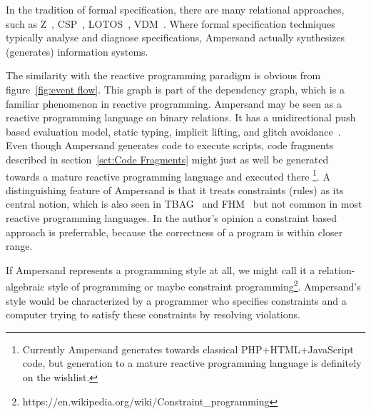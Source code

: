 \documentclass{elsarticle}
\begin{document}
	In the tradition of formal specification, there are many relational approaches, such as Z~\cite{Z}, CSP~\cite{CSP}, LOTOS~\cite{LOTOS}, VDM~\cite{VDM}.
	Where formal specification techniques typically analyse and diagnose specifications,
	Ampersand actually synthesizes (generates) information systems.

	The similarity with the reactive programming paradigm is obvious from figure~\ref{fig:event flow}.
	This graph is part of the dependency graph, which is a familiar phenomenon in reactive programming.
	Ampersand may be seen as a reactive programming language on binary relations.
	It has a unidirectional push based evaluation model, static typing, implicit lifting, and glitch avoidance~\cite{Bainomugisha2013}.
	Even though Ampersand generates code to execute scripts,
	code fragments described in section~\ref{sct:Code Fragments}
	might just as well be generated towards a mature reactive programming language and executed there%
\footnote{Currently Ampersand generates towards classical PHP+HTML+JavaScript code,
	but generation to a mature reactive programming language is definitely on the wishlist.}.
	A distinguishing feature of Ampersand is that it treats constraints (rules) as its central notion,
	which is also seen in TBAG~\cite{Elliott94} and FHM~\cite{Giorgidze2011} but not common in most reactive programming languages.
	In the author's opinion a constraint based approach is preferrable, because the correctness of a program is within closer range.

	If Ampersand represents a programming style at all, we might call it a relation-algebraic style of programming or maybe constraint programming\footnote{https://en.wikipedia.org/wiki/Constraint\_programming}.
	Ampersand's style would be characterized by a programmer who specifies constraints and a computer trying to satisfy these constraints by resolving violations.
\end{document}
